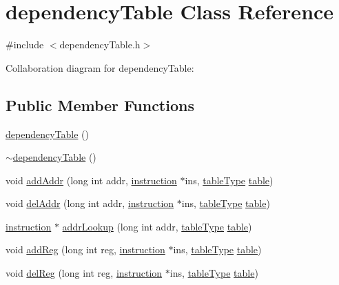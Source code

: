 \hypertarget{classdependencyTable}{
\section{dependencyTable Class Reference}
\label{classdependencyTable}
}


{\ttfamily \#include $<$dependencyTable.h$>$}



Collaboration diagram for dependencyTable:
\subsection*{Public Member Functions}
\begin{DoxyCompactItemize}
\item 
\hyperlink{classdependencyTable_abae7a5ee69f34dfca3d0b1195b773225}{dependencyTable} ()
\item 
\hyperlink{classdependencyTable_a0b227c520264190bae8782e4f9db593a}{$\sim$dependencyTable} ()
\item 
void \hyperlink{classdependencyTable_a2152aa2490daef06772595e126e6e024}{addAddr} (long int addr, \hyperlink{classinstruction}{instruction} $\ast$ins, \hyperlink{backend_2dependencyTable_8h_ab390e08ed69004340ece1f911f48fd1b}{tableType} \hyperlink{classtable}{table})
\item 
void \hyperlink{classdependencyTable_abffec553d72068c891beb9fa8fe73440}{delAddr} (long int addr, \hyperlink{classinstruction}{instruction} $\ast$ins, \hyperlink{backend_2dependencyTable_8h_ab390e08ed69004340ece1f911f48fd1b}{tableType} \hyperlink{classtable}{table})
\item 
\hyperlink{classinstruction}{instruction} $\ast$ \hyperlink{classdependencyTable_ad5215d3493ae1b82e37e673b33fd6892}{addrLookup} (long int addr, \hyperlink{backend_2dependencyTable_8h_ab390e08ed69004340ece1f911f48fd1b}{tableType} \hyperlink{classtable}{table})
\item 
void \hyperlink{classdependencyTable_a8ef091ae6d3ca417958673d50fd9a8a6}{addReg} (long int reg, \hyperlink{classinstruction}{instruction} $\ast$ins, \hyperlink{backend_2dependencyTable_8h_ab390e08ed69004340ece1f911f48fd1b}{tableType} \hyperlink{classtable}{table})
\item 
void \hyperlink{classdependencyTable_a6057fc845371e5846048e7c7ede21cd8}{delReg} (long int reg, \hyperlink{classinstruction}{instruction} $\ast$ins, \hyperlink{backend_2dependencyTable_8h_ab390e08ed69004340ece1f911f48fd1b}{tableType} \hyperlink{classtable}{table})

\end{DoxyCompactItemize}
